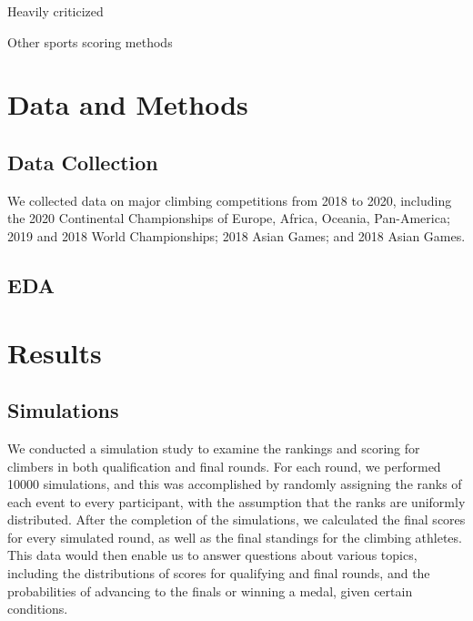 \documentclass[12pt]{article}
\begin{document}
Heavily criticized

Other sports scoring methods

\hypertarget{data-and-methods}{%
\section{Data and Methods}\label{data-and-methods}}

\hypertarget{data-collection}{%
\subsection{Data Collection}\label{data-collection}}

We collected data on major climbing competitions from 2018 to 2020,
including the 2020 Continental Championships of Europe, Africa, Oceania,
Pan-America; 2019 and 2018 World Championships; 2018 Asian Games; and
2018 Asian Games.

\hypertarget{eda}{%
\subsection{EDA}\label{eda}}

\hypertarget{results}{%
\section{Results}\label{results}}

\hypertarget{simulations}{%
\subsection{Simulations}\label{simulations}}

We conducted a simulation study to examine the rankings and scoring for
climbers in both qualification and final rounds. For each round, we
performed 10000 simulations, and this was accomplished by randomly
assigning the ranks of each event to every participant, with the
assumption that the ranks are uniformly distributed. After the
completion of the simulations, we calculated the final scores for every
simulated round, as well as the final standings for the climbing
athletes. This data would then enable us to answer questions about
various topics, including the distributions of scores for qualifying and
final rounds, and the probabilities of advancing to the finals or
winning a medal, given certain conditions.
\end{document}

